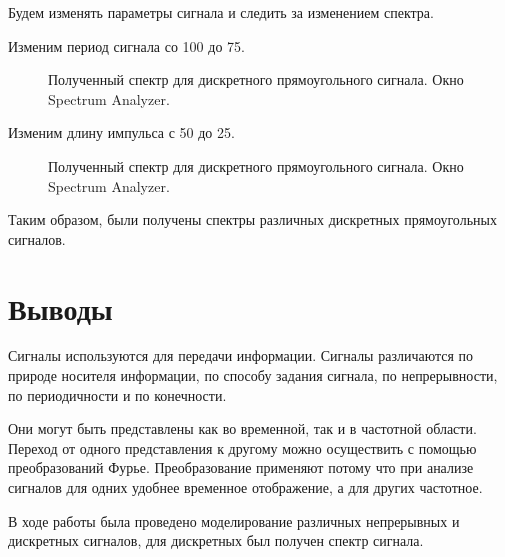 \documentclass[a4paper,14pt]{extarticle}
\begin{document}
Будем изменять параметры сигнала и следить за изменением спектра.

Изменим период сигнала со 100 до 75.

\begin{figure}[H]
\caption{Полученный спектр для дискретного прямоугольного сигнала. Окно Spectrum Analyzer.}
\label{012}
\end{figure}

Изменим длину импульса с 50 до 25.

\begin{figure}[H]
\caption{Полученный спектр для дискретного прямоугольного сигнала. Окно Spectrum Analyzer.}
\label{013}
\end{figure}

Таким образом, были получены спектры различных дискретных прямоугольных сигналов.

\section{Выводы}

Сигналы используются для передачи информации. Сигналы различаются по природе носителя информации, по способу задания сигнала, по непрерывности, по периодичности и по конечности.

Они могут быть представлены как во временной, так и в частотной области. Переход от одного представления к другому можно осуществить с помощью преобразований Фурье. Преобразование применяют потому что при анализе сигналов для одних удобнее временное отображение, а для других частотное.

В ходе работы была проведено моделирование различных непрерывных и дискретных сигналов, для дискретных был получен спектр сигнала.
\end{document}
